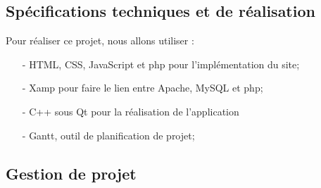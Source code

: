 \documentclass[a4paper]{article}
\begin{document}
	\subsection{Spécifications techniques et de réalisation}
	Pour réaliser ce projet, nous allons utiliser :
	\begin{itemize}
		\item[-] HTML, CSS, JavaScript et php pour l'implémentation du site;
		\item[-] Xamp pour faire le lien entre Apache, MySQL et php;
		\item[-] C++ sous Qt pour la réalisation de l'application
		\item[-] Gantt, outil de planification de projet;
	\end{itemize}

	\subsection{Gestion de projet}
		
\end{document}
